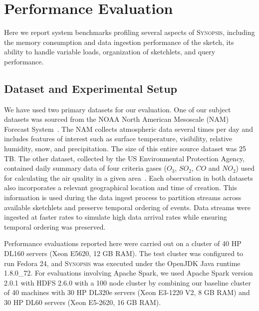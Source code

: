 \section{Performance Evaluation}
Here we report system benchmarks profiling several aspects of \textsc{Synopsis}, including the memory consumption and data ingestion performance of the sketch, its ability to handle variable loads, organization of sketchlets, and query performance.
\label{sec:performance}
\subsection{Dataset and Experimental Setup}
We have used two primary datasets for our evaluation.
One of our subject datasets was sourced from the NOAA North American Mesoscale (NAM) Forecast System~\cite{noaa_nam}.  The NAM collects atmospheric data several times per day and includes features of interest such as surface temperature, visibility, relative humidity, snow, and precipitation. The size of this entire source dataset was 25 TB.
The other dataset, collected by the US Environmental Protection Agency, contained daily summary data of four criteria gases ($O_3$, $SO_2$, $CO$ and $NO_2$) used for calculating the air quality in a given area~\cite{epa-criteriagases}. Each observation in both datasets also incorporates a relevant geographical location and time of creation. This information is used during the data ingest process to partition streams across available sketchlets and preserve temporal ordering of events. Data streams were ingested at faster rates to simulate high data arrival rates while ensuring temporal ordering was preserved.

Performance evaluations reported here were carried out on a cluster of 40 HP DL160 servers (Xeon E5620, 12 GB RAM). The test cluster was configured to run Fedora 24, and \textsc{Synopsis} was executed under the OpenJDK Java runtime 1.8.0\_72.
For evaluations involving Apache Spark, we used Apache Spark version 2.0.1 with HDFS 2.6.0 with a 100 node cluster by combining our baseline cluster of 40 machines with 30 HP DL320e servers (Xeon E3-1220 V2, 8 GB RAM) and 30 HP DL60 servers (Xeon E5-2620, 16 GB RAM). 


